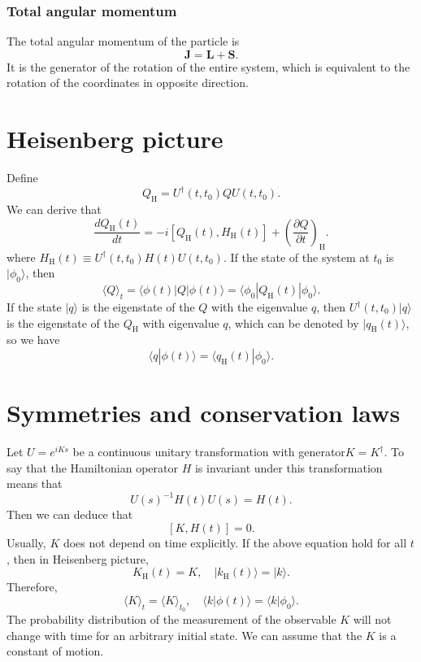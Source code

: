 \subsubsection{Total angular momentum}
\noindent
The total angular momentum of the particle is 
\[\bm{J} = \bm{L} + \bm{S}.\]
It is the generator of the rotation of the entire system, which is equivalent to the rotation of the coordinates in opposite direction.

\section{Heisenberg picture}
\noindent
Define
\[Q_{\mathrm{H}} = U^{\dagger}(t,t_0)QU(t,t_0).\]
We can derive that
\[\frac{dQ_{\mathrm{H}}(t)}{dt} = -i[Q_{\mathrm{H}}(t),H_{\mathrm{H}}(t)] + \left(\frac{\partial Q}{\partial t}\right)_{\mathrm{H}} .\]
where $H_{\mathrm{H}}(t) \equiv U^{\dagger}(t,t_0) H(t) U(t,t_0)$.
If the state of the system at $t_0$ is $|\phi_0\rangle$, then
\[\langle Q \rangle_t = \langle \phi(t) | Q | \phi(t) \rangle = \langle \phi_0 | Q_{\mathrm{H}}(t) | \phi_0 \rangle.\]
If the state $|q\rangle$ is the eigenstate of the $Q$ with the eigenvalue $q$, then $U^{\dagger}(t,t_0)|q\rangle$ is the eigenstate of the $Q_{\mathrm{H}}$ with eigenvalue $q$, which can be denoted by $|q_{\mathrm{H}}(t)\rangle$, so we have
\[\langle q | \phi(t) \rangle = \langle q_{\mathrm{H}}(t) | \phi_0 \rangle.\]

\section{Symmetries and conservation laws}
\noindent
Let $U = e^{iKs}$ be a continuous unitary transformation with generator$K=K^{\dagger}$. To say that the Hamiltonian
operator $H$ is invariant under this transformation means that
\[U(s)^{-1} H(t) U(s) = H(t).\]
Then we can deduce that
\[[K,H(t)] = 0.\]
Usually, $K$ does not depend on time explicitly. If the above equation hold for all $t$, then in Heisenberg picture, 
\[K_{\mathrm{H}}(t) = K , \quad |k_{\mathrm{H}}(t) \rangle = | k \rangle.\]
Therefore, 
\[\langle K \rangle_t = \langle K \rangle_{t_0} , \quad \langle k | \phi(t) \rangle = \langle k | \phi_0 \rangle.\]
The probability distribution of the measurement of the observable $K$ will not change with time for an arbitrary initial state. We can assume that the $K$ is a constant of motion.

